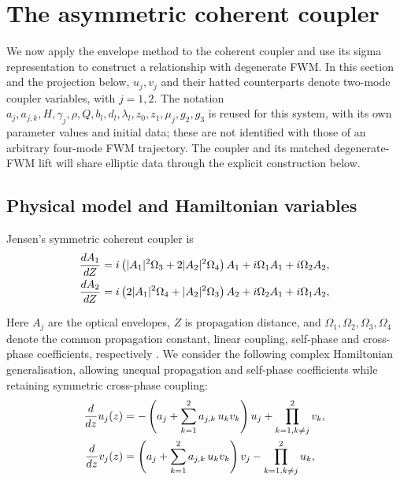 \documentclass[11pt,a4paper]{article}
\numberwithin{equation}{section}
\begin{document}

\section{The asymmetric coherent coupler}\label{cc:sec:coupler}
We now apply the envelope method to the coherent coupler and use its sigma representation to construct a relationship with degenerate FWM.
In this section and the projection below, $u_j,v_j$ and their hatted counterparts denote two-mode coupler variables, with $j=1,2$.
The notation $a_j,a_{j,k},H,\gamma_j,\rho,Q,b_l,d_l,\lambda_l,z_0,z_1,\mu_j,g_2,g_3$ is reused for this system, with its own parameter values and initial data; these are not identified with those of an arbitrary four-mode FWM trajectory.
The coupler and its matched degenerate-FWM lift will share elliptic data through the explicit construction below.

\subsection{Physical model and Hamiltonian variables}
Jensen's symmetric coherent coupler is
\begin{align}
\frac{dA_1}{dZ} &= i \left(|A_1|^2 {\Omega}_{3} + 2 |A_2|^2 {\Omega}_{4}\right) A_1 + i {\Omega}_{1} A_1  + i {\Omega}_{2} A_2, \notag \\
\frac{dA_2}{dZ} &= i \left(2 |A_1|^2 {\Omega}_{4} + |A_2|^2 {\Omega}_{3}\right) A_2 + i {\Omega}_{2} A_1  + i {\Omega}_{1} A_2, \label{cc:eq:jensen}
\end{align}

Here $A_j$ are the optical envelopes, $Z$ is propagation distance, and $\Omega_1,\Omega_2,\Omega_3,\Omega_4$ denote the common propagation constant, linear coupling, self-phase and cross-phase coefficients, respectively \cite{jensenNonlinearCoherentCoupler1982}.
We consider the following complex Hamiltonian generalisation, allowing unequal propagation and self-phase coefficients while retaining symmetric cross-phase coupling:
\begin{align}
\frac{d}{d z} u_j{\left(z \right)} &= - \left({a}_{j} + \sum_{k=1}^{2} {a}_{j,k}\,u_k v_k \right) u_j + \prod\limits_{k=1, k \ne j}^{2} v_k, \notag \\
\frac{d}{d z} v_j{\left(z \right)} &= \left({a}_{j} + \sum_{k=1}^{2} {a}_{j,k}\,u_k v_k \right) v_j - \prod\limits_{k=1, k \ne j}^{2} u_k, \label{cc:eq:uv-system}
\end{align}
\end{document}
